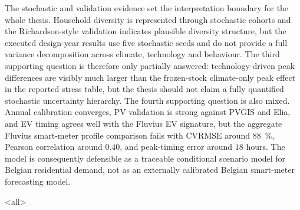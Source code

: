 The stochastic and validation evidence set the interpretation boundary for the whole thesis. Household diversity is represented through stochastic cohorts and the Richardson-style validation indicates plausible diversity structure, but the executed design-year results use five stochastic seeds and do not provide a full variance decomposition across climate, technology and behaviour. The third supporting question is therefore only partially answered: technology-driven peak differences are visibly much larger than the frozen-stock climate-only peak effect in the reported stress table, but the thesis should not claim a fully quantified stochastic uncertainty hierarchy. The fourth supporting question is also mixed. Annual calibration converges, PV validation is strong against PVGIS and Elia, and EV timing agrees well with the Fluvius EV signature, but the aggregate Fluvius smart-meter profile comparison fails with CVRMSE around \SI{88}{\percent}, Pearson correlation around $0.40$, and peak-timing error around $18$ hours. The model is consequently defensible as a traceable conditional scenario model for Belgian residential demand, not as an externally calibrated Belgian smart-meter forecasting model.


\mode<all> %
